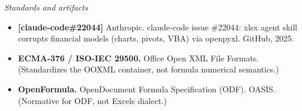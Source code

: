\documentclass[
]{article}
\providecommand{\tightlist}{%
  \setlength{\itemsep}{0pt}\setlength{\parskip}{0pt}}
\begin{document}
\emph{Standards and artifacts}

\begin{itemize}
\tightlist
\item
  \textbf{{[}claude-code\#22044{]}} Anthropic. claude-code issue
  \#22044: xlsx agent skill corrupts financial models (charts, pivots,
  VBA) via openpyxl. GitHub, 2025.
\item
  \textbf{ECMA-376 / ISO-IEC 29500.} Office Open XML File Formats.
  (Standardizes the OOXML container, not formula numerical semantics.)
\item
  \textbf{OpenFormula.} OpenDocument Formula Specification (ODF). OASIS.
  (Normative for ODF, not Excel\textquotesingle s dialect.)
\end{itemize}
\end{document}
